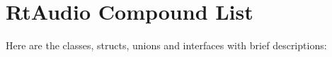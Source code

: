\section{Rt\-Audio Compound List}
Here are the classes, structs, unions and interfaces with brief descriptions:\begin{CompactList}
\item{}
\item{}
\item{}
\end{CompactList}
